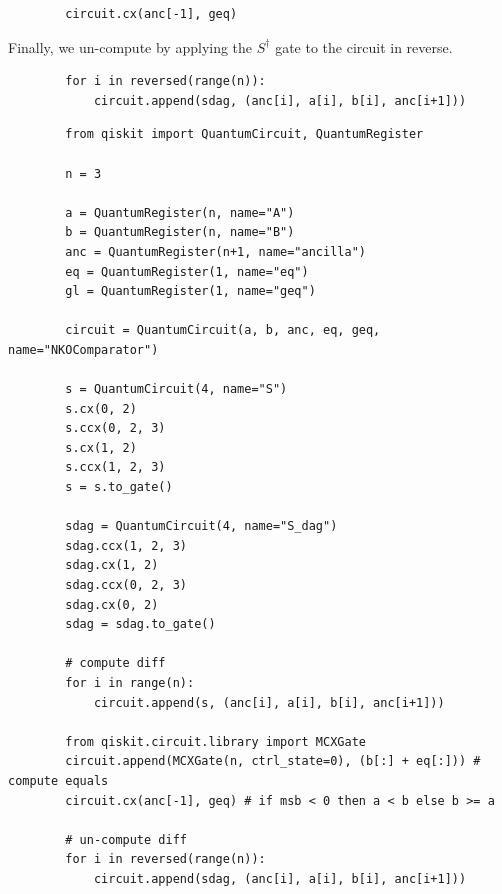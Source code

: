 \begin{listing}[!ht]
    \centering
    \begin{verbatim}
        circuit.cx(anc[-1], geq)
    \end{verbatim}
    \caption{}
\end{listing}

\newpage

Finally, we un-compute by applying the $S^\dag$ gate to the circuit in reverse.

\begin{listing}[ht]
    \centering
    \begin{verbatim}
        for i in reversed(range(n)):
            circuit.append(sdag, (anc[i], a[i], b[i], anc[i+1]))
    \end{verbatim}
    \caption{}
\end{listing}

\begin{listing}[ht]
    \centering
    \begin{verbatim}
        from qiskit import QuantumCircuit, QuantumRegister

        n = 3

        a = QuantumRegister(n, name="A")
        b = QuantumRegister(n, name="B")
        anc = QuantumRegister(n+1, name="ancilla")
        eq = QuantumRegister(1, name="eq")
        gl = QuantumRegister(1, name="geq")

        circuit = QuantumCircuit(a, b, anc, eq, geq, name="NKOComparator")

        s = QuantumCircuit(4, name="S")
        s.cx(0, 2)
        s.ccx(0, 2, 3)
        s.cx(1, 2)
        s.ccx(1, 2, 3)
        s = s.to_gate()
            
        sdag = QuantumCircuit(4, name="S_dag")
        sdag.ccx(1, 2, 3)
        sdag.cx(1, 2)
        sdag.ccx(0, 2, 3)
        sdag.cx(0, 2)
        sdag = sdag.to_gate()

        # compute diff
        for i in range(n):
            circuit.append(s, (anc[i], a[i], b[i], anc[i+1]))

        from qiskit.circuit.library import MCXGate
        circuit.append(MCXGate(n, ctrl_state=0), (b[:] + eq[:])) # compute equals
        circuit.cx(anc[-1], geq) # if msb < 0 then a < b else b >= a

        # un-compute diff
        for i in reversed(range(n)):
            circuit.append(sdag, (anc[i], a[i], b[i], anc[i+1]))
    \end{verbatim}
\end{listing}